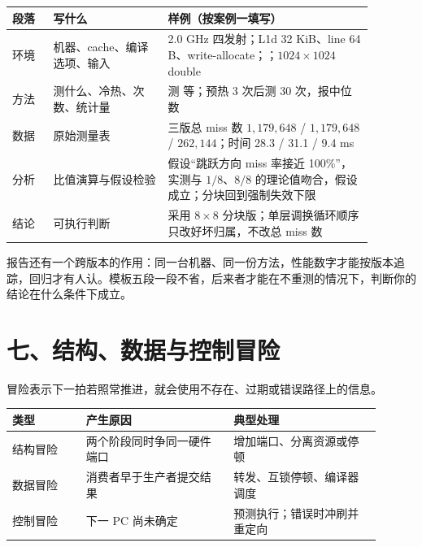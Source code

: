 \begin{longtable}{L{0.10\linewidth}L{0.28\linewidth}L{0.50\linewidth}}
\toprule
段落 & 写什么 & 样例（按案例一填写） \\
\midrule
环境 & 机器、cache、编译选项、输入 & 2.0 GHz 四发射；L1d 32 KiB、line 64 B、write-allocate；；$1024\times1024$ double \\\tablerowrule
方法 & 测什么、冷热、次数、统计量 &  测  等；预热 3 次后测 30 次，报中位数 \\\tablerowrule
数据 & 原始测量表 & 三版总 miss 数 $1{,}179{,}648$ / $1{,}179{,}648$ / $262{,}144$；时间 28.3 / 31.1 / 9.4 ms \\\tablerowrule
分析 & 比值演算与假设检验 & 假设“跳跃方向 miss 率接近 100\%”，实测与 $1/8$、$8/8$ 的理论值吻合，假设成立；分块回到强制失效下限 \\\tablerowrule
结论 & 可执行判断 & 采用 $8\times8$ 分块版；单层调换循环顺序只改好坏归属，不改总 miss 数 \\
\bottomrule
\end{longtable}

报告还有一个跨版本的作用：同一台机器、同一份方法，性能数字才能按版本追踪，回归才有人认。模板五段一段不省，后来者才能在不重测的情况下，判断你的结论在什么条件下成立。




























\section{七、结构、数据与控制冒险}

冒险表示下一拍若照常推进，就会使用不存在、过期或错误路径上的信息。

\begin{longtable}{L{0.18\linewidth}L{0.36\linewidth}L{0.36\linewidth}}
\toprule
类型 & 产生原因 & 典型处理 \\
\midrule
结构冒险 & 两个阶段同时争同一硬件端口 & 增加端口、分离资源或停顿 \\\tablerowrule
数据冒险 & 消费者早于生产者提交结果 & 转发、互锁停顿、编译器调度 \\\tablerowrule
控制冒险 & 下一 PC 尚未确定 & 预测执行；错误时冲刷并重定向 \\
\bottomrule
\end{longtable}

